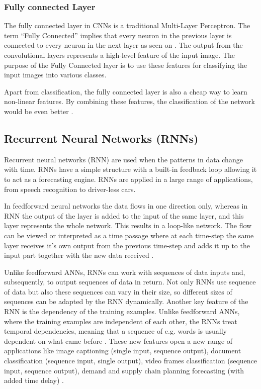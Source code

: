 \subsubsection{Fully connected Layer}
The fully connected layer in CNNs is a traditional Multi-Layer Perceptron. The term “Fully Connected” implies that every neuron in the previous layer is connected to every neuron in the next layer as seen on . The output from the convolutional layers represents a high-level feature of the input image. The purpose of the Fully Connected layer is to use these features for classifying the input images into various classes. 

Apart from classification, the fully connected layer is also a cheap way to learn non-linear features. By combining these features, the classification of the network would be even better \cite{Fully_Connected_Layer}. 

\subsection{Recurrent Neural Networks (RNNs)} \label{RNN}
Recurrent neural networks (RNN) are used when the patterns in data change with time. RNNs have a simple structure with a built-in feedback loop allowing it to act as a forecasting engine. RNNs are applied in a large range of applications, from speech recognition to driver-less cars. 

In feedforward neural networks the data flows in one direction only, whereas in RNN the output of the layer is added to the input of the same layer, and this layer represents the whole network. This results in a loop-like network. The flow can be viewed or interpreted as a time passage where at each time-step the same layer receives it's own output from the previous time-step and adds it up to the input part together with the new data received \cite{RNNvideo}. 

Unlike feedforward ANNs, RNNs can work with sequences of data inputs and, subsequently, to output sequences of data in return. Not only RNNs use sequence of data but also these sequences can vary in their size, so different sizes of sequences can be adapted by the RNN dynamically. Another key feature of the RNN is the dependency of the training examples. Unlike feedforward ANNs, where the training examples are independent of each other, the RNNs treat temporal dependencies, meaning that a sequence of e.g. words is usually dependent on what came before \cite{NeonRNN}. These new features open a new range of applications like image captioning (single input, sequence output), document classification (sequence input, single output), video frames classification (sequence input, sequence output), demand and supply chain planning forecasting (with added time delay) \cite{RNNvideo}.

